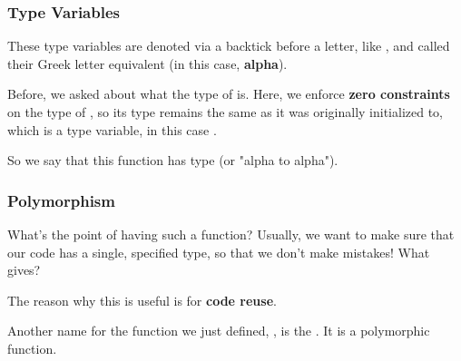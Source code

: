 \documentclass[aspectratio=169, handout]{beamer}
\begin{document}
\begin{frame}[fragile]
  \frametitle{Type Variables}

  These type variables are denoted via a backtick before a letter, like
  , and called their Greek letter equivalent (in this case, \textbf{alpha}).

  \pause
  \vspace{\fill}

  Before, we asked about what the type of  is. Here, we enforce 
  \textbf{zero constraints} on the type of , so its type remains the same
  as it was originally initialized to, which is a type variable, in this case .

  \pause
  \vspace{\fill}
  
  So we say that this function has type  (or "alpha to alpha").
\end{frame}

\begin{frame}[fragile]
  \frametitle{Polymorphism}

  What's the point of having such a function? Usually, we want to make sure that
  our code has a single, specified type, so that we don't make mistakes! What gives?

  \pause
  \vspace{\fill}

  The reason why this is useful is for \textbf{code reuse}.

  \pause
  \vspace{\fill}
  

  \pause
  \vspace{\fill}

  Another name for the function we just defined, , is the 
  . It is a polymorphic function.
\end{frame}
\end{document}

